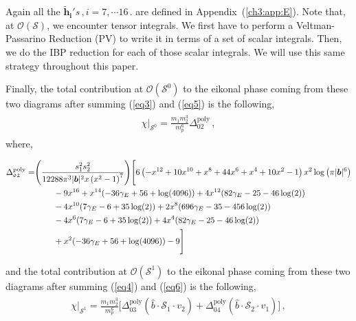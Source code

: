 Again all the $ \boldsymbol{\tilde h_i}'s\,, i=7,\cdots 16\,.$ are defined in Appendix~(\ref{ch3:app:E}). Note that, at $\mathcal{O}(\mathcal{S})$, we encounter tensor integrals. We first have to perform a Veltman-Passarino Reduction (PV) to write it in terms of a set of scalar integrals. Then, we do the IBP reduction for each of those scalar integrals. We will use this same strategy throughout this paper.  \par
Finally, the total contribution at $\mathcal{O}(\mathcal{S}^0)$ to the eikonal phase coming from these two diagrams after summing (\ref{eq3}) and (\ref{eq5}) is the following, 
\begin{align}
    \begin{split}  \label{eqt2}
   \chi\Big|_{\mathcal{S}^0} =\frac{m_1m_2^3}{m_p^6}\Delta_{\mathfrak{02}}^{\textrm{poly}}\,,
 \end{split}
\end{align}
\enlargethispage{2\baselineskip}
where, 
\begin{thesiscompactdisplay}
\begin{align}
    \begin{split} 
\Delta_{\mathfrak{02}}^{\textrm{poly}}= &\Bigg(\frac{s_1^2s_2^2}{12288 \pi ^3 |\boldsymbol{b}|^2 x \left(x^2-1\right)^7}\Bigg)\Bigg[6 \left(-x^{12}+10 x^{10}+x^8+44 x^6+x^4+10 x^2-1\right) x^2 \log \left(\pi  |\boldsymbol{b}|^6\right)\\&\hspace{0.8cm}-9 x^{16}+x^{14} (-36 \gamma_E +56+\log (4096))+4 x^{12} (82 \gamma_E  -25-46 \log (2))\\&\hspace{0.8cm}-4 x^{10} (7 \gamma_E -6+35 \log (2))+2 x^8 (696 \gamma_E  -35-456 \log (2))\\&\hspace{0.8cm}-4 x^6 (7 \gamma_E  -6+35 \log (2))+4 x^4 (82 \gamma_E  -25-46 \log (2))\\&\hspace{0.8cm}+x^2 (-36 \gamma_E  +56+\log (4096))-9\Bigg]
     \end{split}
\end{align}
\end{thesiscompactdisplay}
and the total contribution at $\mathcal{O}(\mathcal{S}^1)$ to the eikonal phase coming from these two diagrams after summing (\ref{eq4}) and (\ref{eq6}) is the following, 
\begin{align}
    \begin{split}   \label{eqt3}
     \chi\Big|_{\mathcal{S}^1}=\frac{m_1m_2^3}{m_p^6}\Bigg[\Delta_{\mathfrak{03}}^{\textrm{poly}}(\hat{b}\cdot \mathcal{S}_1\cdot v_2)+\Delta_{\mathfrak{04}}^{\textrm{poly}}(\hat{b}\cdot \mathcal{S}_2\cdot v_1)\Bigg]\,,
     \end{split}
\end{align}
